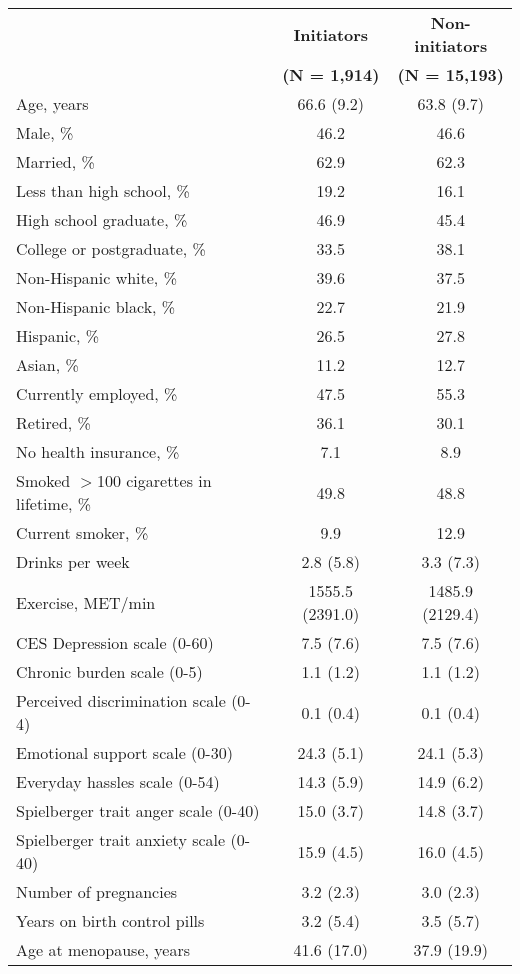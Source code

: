 \captionsetup[table]{labelformat=empty,skip=1pt}
\begin{longtable}{lcc}
\toprule
 & \textbf{Initiators} & \textbf{Non-initiators} \\ 
 & \textbf{(N = 1,914)} & \textbf{(N = 15,193)} \\ 
\midrule
Age, years & 66.6 (9.2) & 63.8 (9.7) \\ 
Male, \% & 46.2 & 46.6 \\ 
Married, \% & 62.9 & 62.3 \\ 
Less than high school, \% & 19.2 & 16.1 \\ 
High school graduate, \% & 46.9 & 45.4 \\ 
College or postgraduate, \% & 33.5 & 38.1 \\ 
Non-Hispanic white, \% & 39.6 & 37.5 \\ 
Non-Hispanic black, \% & 22.7 & 21.9 \\ 
Hispanic, \% & 26.5 & 27.8 \\ 
Asian, \% & 11.2 & 12.7 \\ 
Currently employed, \% & 47.5 & 55.3 \\ 
Retired, \% & 36.1 & 30.1 \\ 
No health insurance, \% & 7.1 & 8.9 \\ 
Smoked $>$100 cigarettes in lifetime, \% & 49.8 & 48.8 \\ 
Current smoker, \% & 9.9 & 12.9 \\ 
Drinks per week & 2.8 (5.8) & 3.3 (7.3) \\ 
Exercise, MET/min & 1555.5 (2391.0) & 1485.9 (2129.4) \\ 
CES Depression scale (0-60) & 7.5 (7.6) & 7.5 (7.6) \\ 
Chronic burden scale (0-5) & 1.1 (1.2) & 1.1 (1.2) \\ 
Perceived discrimination scale (0-4) & 0.1 (0.4) & 0.1 (0.4) \\ 
Emotional support scale (0-30) & 24.3 (5.1) & 24.1 (5.3) \\ 
Everyday hassles scale (0-54) & 14.3 (5.9) & 14.9 (6.2) \\ 
Spielberger trait anger scale (0-40) & 15.0 (3.7) & 14.8 (3.7) \\ 
Spielberger trait anxiety scale (0-40) & 15.9 (4.5) & 16.0 (4.5) \\ 
Number of pregnancies & 3.2 (2.3) & 3.0 (2.3) \\ 
Years on birth control pills & 3.2 (5.4) & 3.5 (5.7) \\ 
Age at menopause, years & 41.6 (17.0) & 37.9 (19.9) \\ 

\end{longtable}
